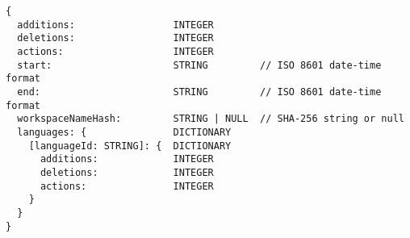 \begin{verbatim}
{
  additions:                 INTEGER
  deletions:                 INTEGER
  actions:                   INTEGER
  start:                     STRING         // ISO 8601 date-time format
  end:                       STRING         // ISO 8601 date-time format
  workspaceNameHash:         STRING | NULL  // SHA-256 string or null
  languages: {               DICTIONARY
    [languageId: STRING]: {  DICTIONARY
      additions:             INTEGER
      deletions:             INTEGER
      actions:               INTEGER
    }
  }
}
\end{verbatim}
